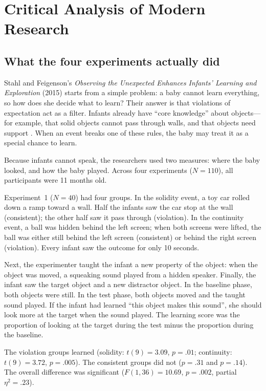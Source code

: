 \documentclass{article}
\begin{document}
\section{Critical Analysis of Modern Research}\label{sec:critique}

\subsection{What the four experiments actually did}

Stahl and Feigenson's \emph{Observing the Unexpected Enhances Infants' Learning and
Exploration} (2015) starts from a simple problem: a baby cannot learn everything, so how
does she decide what to learn? Their answer is that violations of expectation act as a
filter. Infants already have ``core knowledge'' about objects---for example, that solid
objects cannot pass through walls, and that objects need support
\citep{spelke2007core}. When an event breaks one of these rules, the baby may treat it as a
special chance to learn.

Because infants cannot speak, the researchers used two measures: where the baby looked,
and how the baby played. Across four experiments ($N=110$), all participants were 11
months old.

Experiment~1 ($N=40$) had four groups. In the solidity event, a toy car rolled down a ramp
toward a wall. Half the infants saw the car stop at the wall (consistent); the other half
saw it pass through (violation). In the continuity event, a ball was hidden behind the left
screen; when both screens were lifted, the ball was either still behind the left screen
(consistent) or behind the right screen (violation). Every infant saw the outcome for only
10 seconds.

Next, the experimenter taught the infant a new property of the object: when the object was
moved, a squeaking sound played from a hidden speaker. Finally, the infant saw the target
object and a new distractor object. In the baseline phase, both objects were still. In the
test phase, both objects moved and the taught sound played. If the infant had learned
``this object makes this sound'', she should look more at the target when the sound played.
The learning score was the proportion of looking at the target during the test minus the
proportion during the baseline.

The violation groups learned (solidity: $t(9)=3.09$, $p=.01$; continuity: $t(9)=3.72$,
$p=.005$). The consistent groups did not ($p=.31$ and $p=.14$). The overall difference was
significant ($F(1,36)=10.69$, $p=.002$, partial $\eta^2=.23$).
\end{document}
